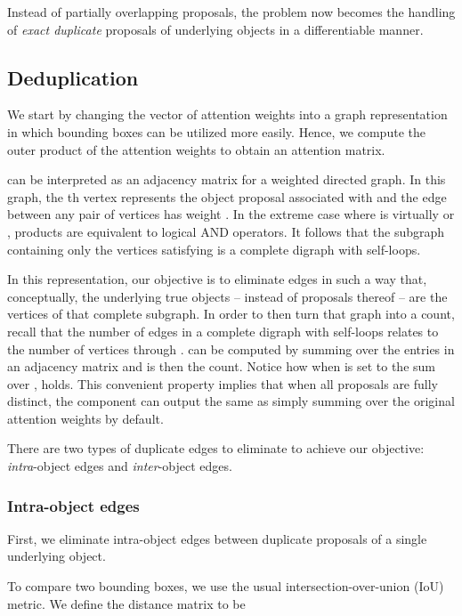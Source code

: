 \documentclass[letterpaper]{article}
\begin{document}
Instead of partially overlapping proposals, the problem now becomes the handling of \emph{exact duplicate} proposals of underlying objects in a differentiable manner.


\subsection{Deduplication}
We start by changing the vector of attention weights  into a graph representation in which bounding boxes can be utilized more easily.
Hence, we compute the outer product of the attention weights to obtain an attention matrix.



 can be interpreted as an adjacency matrix for a weighted directed graph.
In this graph, the th vertex represents the object proposal associated with  and the edge between any pair of vertices  has weight .
In the extreme case where  is virtually  or , products are equivalent to logical AND operators.
It follows that the subgraph containing only the vertices satisfying  is a complete digraph with self-loops.

In this representation, our objective is to eliminate edges in such a way that, conceptually, the underlying true objects -- instead of proposals thereof -- are the vertices of that complete subgraph.
In order to then turn that graph into a count, recall that the number of edges  in a complete digraph with self-loops relates to the number of vertices  through .
 can be computed by summing over the entries in an adjacency matrix and  is then the count.
Notice how when  is set to the sum over ,  holds.
This convenient property implies that when all proposals are fully distinct, the component can output the same as simply summing over the original attention weights by default.

There are two types of duplicate edges to eliminate to achieve our objective: \emph{intra}-object edges and \emph{inter}-object edges.

\subsubsection{Intra-object edges}

First, we eliminate intra-object edges between duplicate proposals of a single underlying object.

To compare two bounding boxes, we use the usual intersection-over-union (IoU) metric.
We define the distance matrix  to be
\end{document}
